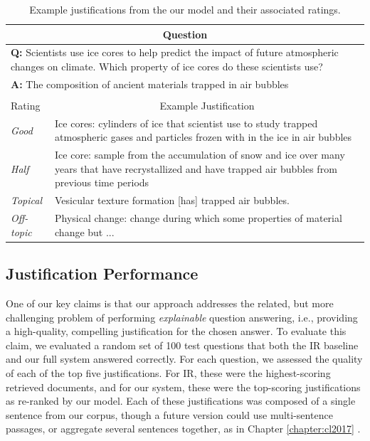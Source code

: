 %
%
\begin{table}[t]
\begin{center}
\begin{tabularx}{\linewidth}{p{2cm}p{12cm}}
\hline
\multicolumn{2}{c}{Question} \\
\hline			
\multicolumn{2}{p{14cm}}{\textbf{Q:} Scientists use ice cores to help predict the impact of future atmospheric changes on climate. Which property of ice cores do these scientists use? } \\
\multicolumn{2}{p{15cm}}{\textbf{A:} The composition of ancient materials trapped in air bubbles} \\
\multicolumn{1}{c}{} & \multicolumn{1}{c}{} \\				
\hline
\multicolumn{1}{l}{Rating} & \multicolumn{1}{c}{Example Justification} \\
\hline			
{\em Good }		&	Ice cores: cylinders of ice that scientist use to study trapped atmospheric gases and particles frozen with in the ice in air bubbles \\
{\em Half }		&	Ice core: sample from the accumulation of snow and ice over many years that have recrystallized and have	trapped air bubbles from previous time periods \\
{\em Topical }	&   Vesicular texture formation [has] trapped air bubbles. \\
{\em Off-topic }	&	Physical change: change during which some properties of material change but ... \\
\end{tabularx}
\caption{{  Example justifications from the our model and their associated ratings. }} 
\label{tab:justification_examples}
\end{center}
\end{table}

\subsection{Justification Performance}
\label{sec-emnlp2017:justification_results}
One of our key claims is that our approach addresses the related, but more challenging problem of performing \emph{explainable} question answering, i.e., providing a high-quality, compelling justification for the chosen answer.  To evaluate this claim, we evaluated a random set of 100 test questions that both the IR baseline and our full system answered correctly.  For each question, we assessed the quality of each of the top five justifications.  For IR, these were the highest-scoring retrieved documents, and for our system, these were the top-scoring justifications as re-ranked by our model.  
Each of these justifications was composed of a single sentence from our corpus, though a future version could use multi-sentence passages, or aggregate several sentences together, as in Chapter \ref{chapter:cl2017} \citep{jansen2017framing}.

